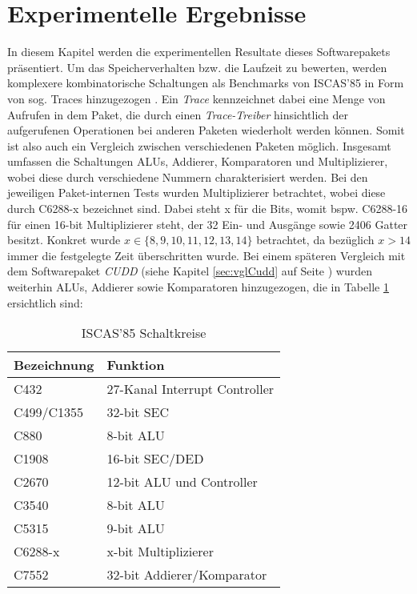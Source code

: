 \newpage
\section{Experimentelle Ergebnisse}
\label{sec:experimentelleErgebnisse}
In diesem Kapitel werden die experimentellen Resultate dieses Softwarepakets präsentiert. Um das Speicherverhalten bzw. die Laufzeit zu bewerten, werden komplexere kombinatorische Schaltungen als Benchmarks von ISCAS'85 in Form von sog. Traces hinzugezogen \cite{b1988}. Ein \emph{Trace} kennzeichnet dabei eine Menge von Aufrufen in dem Paket, die durch einen \emph{Trace-Treiber} hinsichtlich der aufgerufenen Operationen bei anderen Paketen wiederholt werden können. Somit ist also auch ein Vergleich zwischen verschiedenen Paketen möglich. Insgesamt umfassen die Schaltungen ALUs, Addierer, Komparatoren und Multiplizierer, wobei diese durch verschiedene Nummern charakterisiert werden. Bei den jeweiligen Paket-internen Tests wurden Multiplizierer betrachtet, wobei diese durch \glqq C6288-x\grqq{} bezeichnet sind. Dabei steht \glqq x\grqq{} für die Bits, womit bspw. \glqq C6288-16\grqq{} für einen 16-bit Multiplizierer steht, der 32 Ein- und Ausgänge sowie 2406 Gatter besitzt. Konkret wurde $x \in \{ 8,9,10,11,12,13,14 \}$ betrachtet, da bezüglich $x > 14$ immer die festgelegte Zeit überschritten wurde. Bei einem späteren Vergleich mit dem Softwarepaket \emph{CUDD} (siehe Kapitel \ref{sec:vglCudd} auf Seite \pageref{sec:vglCudd}) wurden weiterhin ALUs, Addierer sowie Komparatoren hinzugezogen, die in Tabelle \ref{tab:iscas85} ersichtlich sind:
\begin{table}[bth]
	\centering
	\caption{ISCAS'85 Schaltkreise}
	\label{tab:iscas85}
	\begin{tabular}{ | l | p{10cm} | }
		\hline
		\textbf{Bezeichnung} & \textbf{Funktion} \\ \hline
		C432 & 27-Kanal Interrupt Controller \\ \hline
		C499/C1355 & 32-bit SEC \\ \hline
		C880 & 8-bit ALU \\ \hline
		C1908 & 16-bit SEC/DED \\ \hline
		C2670 & 12-bit ALU und Controller \\ \hline
		C3540 & 8-bit ALU \\ \hline
		C5315 & 9-bit ALU \\ \hline
		C6288-x & x-bit Multiplizierer \\ \hline
		C7552 & 32-bit Addierer/Komparator \\ \hline
	\end{tabular}
\end{table}\\
